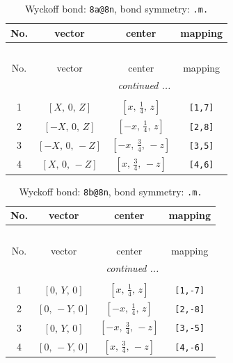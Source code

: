 \documentclass[fleqn,8pt]{jsarticle}
\begin{document}
\begin{longtable}{cccc}
\caption{Wyckoff bond: {\tt 8a@8n}, bond symmetry: {\tt .m.}}
 \\
 \hline \hline
No. & vector & center & mapping \\ \hline \endfirsthead

\multicolumn{3}{l}{\tablename\ \thetable{}} \\
 \hline \hline
No. & vector & center & mapping \\ \hline \endhead

 \hline \hline
\multicolumn{3}{r}{\footnotesize\it continued ...} \\ \endfoot

 \hline \hline
\multicolumn{3}{r}{} \\ \endlastfoot

1 & $\left[ X,\, 0,\, Z \right]$ & $\left[ x,\, \frac{1}{4},\, z \right]$ & {\tt [1,7]} \\ \hline
2 & $\left[ - X,\, 0,\, Z \right]$ & $\left[ - x,\, \frac{1}{4},\, z \right]$ & {\tt [2,8]} \\ \hline
3 & $\left[ - X,\, 0,\, - Z \right]$ & $\left[ - x,\, \frac{3}{4},\, - z \right]$ & {\tt [3,5]} \\ \hline
4 & $\left[ X,\, 0,\, - Z \right]$ & $\left[ x,\, \frac{3}{4},\, - z \right]$ & {\tt [4,6]} \\
\end{longtable}
\renewcommand{\arraystretch}{1.2}
\begin{longtable}{cccc}
\caption{Wyckoff bond: {\tt 8b@8n}, bond symmetry: {\tt .m.}}
 \\
 \hline \hline
No. & vector & center & mapping \\ \hline \endfirsthead

\multicolumn{3}{l}{\tablename\ \thetable{}} \\
 \hline \hline
No. & vector & center & mapping \\ \hline \endhead

 \hline \hline
\multicolumn{3}{r}{\footnotesize\it continued ...} \\ \endfoot

 \hline \hline
\multicolumn{3}{r}{} \\ \endlastfoot

1 & $\left[ 0,\, Y,\, 0 \right]$ & $\left[ x,\, \frac{1}{4},\, z \right]$ & {\tt [1,-7]} \\ \hline
2 & $\left[ 0,\, - Y,\, 0 \right]$ & $\left[ - x,\, \frac{1}{4},\, z \right]$ & {\tt [2,-8]} \\ \hline
3 & $\left[ 0,\, Y,\, 0 \right]$ & $\left[ - x,\, \frac{3}{4},\, - z \right]$ & {\tt [3,-5]} \\ \hline
4 & $\left[ 0,\, - Y,\, 0 \right]$ & $\left[ x,\, \frac{3}{4},\, - z \right]$ & {\tt [4,-6]} \\
\end{longtable}
\end{document}
